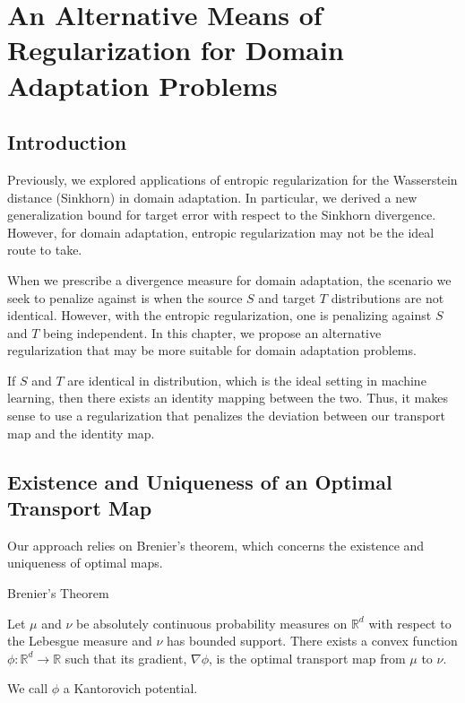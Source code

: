 \chapter{An Alternative Means of Regularization for Domain Adaptation Problems}

\section*{Introduction}
Previously, we explored applications of entropic regularization for the Wasserstein distance (Sinkhorn) in domain adaptation. In particular, we derived a new generalization bound for target error with respect to the Sinkhorn divergence. However, for domain adaptation, entropic regularization may not be the ideal route to take.
 
When we prescribe a divergence measure for domain adaptation, the scenario we seek to penalize against is when the source $S$ and target $T$ distributions are not identical. However, with the entropic regularization, one is penalizing against $S$ and $T$ being independent. In this chapter, we propose an alternative regularization that may be more suitable for domain adaptation problems.

If $S$ and $T$ are identical in distribution, which is the ideal setting in machine learning, then there exists an identity mapping between the two. Thus, it makes sense to use a regularization that penalizes the deviation between our transport map and the identity map.

\newpage

\section*{Existence and Uniqueness of an Optimal Transport Map}
Our approach relies on Brenier's theorem, which concerns the existence and uniqueness of optimal maps.

\begin{theorem}{Brenier's Theorem}
	
	Let $\mu$ and $\nu$ be absolutely continuous probability measures on $\mathbb{R}^d$ with respect to the Lebesgue measure and $\nu$ has bounded support. There exists a convex function $\phi: \mathbb{R}^d\to \mathbb{R}$ such that its gradient, $\nabla \phi$, is the optimal transport map from $\mu$ to $\nu$.  
	
\end{theorem}

We call $\phi$ a Kantorovich potential.

